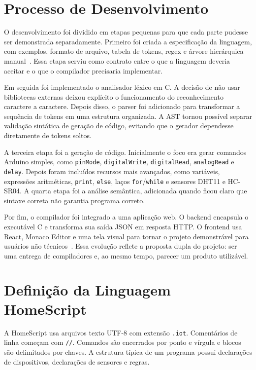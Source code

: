 \documentclass[conference]{IEEEtran}
\begin{document}
\section{Processo de Desenvolvimento}
O desenvolvimento foi dividido em etapas pequenas para que cada parte pudesse ser demonstrada separadamente. Primeiro foi criada a especificação da linguagem, com exemplos, formato de arquivo, tabela de tokens, regex e árvore hierárquica manual~\cite{docs-def,docs-tokens}. Essa etapa serviu como contrato entre o que a linguagem deveria aceitar e o que o compilador precisaria implementar.

Em seguida foi implementado o analisador léxico em C. A decisão de não usar bibliotecas externas deixou explícito o funcionamento do reconhecimento caractere a caractere. Depois disso, o parser foi adicionado para transformar a sequência de tokens em uma estrutura organizada. A AST tornou possível separar validação sintática de geração de código, evitando que o gerador dependesse diretamente de tokens soltos.

A terceira etapa foi a geração de código. Inicialmente o foco era gerar comandos Arduino simples, como \texttt{pinMode}, \texttt{digitalWrite}, \texttt{digitalRead}, \texttt{analogRead} e \texttt{delay}. Depois foram incluídos recursos mais avançados, como variáveis, expressões aritméticas, \texttt{print}, \texttt{else}, laços \texttt{for}/\texttt{while} e sensores DHT11 e HC-SR04. A quarta etapa foi a análise semântica, adicionada quando ficou claro que sintaxe correta não garantia programa correto.

Por fim, o compilador foi integrado a uma aplicação web. O backend encapsula o executável C e transforma sua saída JSON em resposta HTTP. O frontend usa React, Monaco Editor e uma tela visual para tornar o projeto demonstrável para usuários não técnicos~\cite{fastapi,react,monaco}. Essa evolução reflete a proposta dupla do projeto: ser uma entrega de compiladores e, ao mesmo tempo, parecer um produto utilizável.

\section{Definição da Linguagem HomeScript}
A HomeScript usa arquivos texto UTF-8 com extensão \texttt{.iot}. Comentários de linha começam com \texttt{//}. Comandos são encerrados por ponto e vírgula e blocos são delimitados por chaves. A estrutura típica de um programa possui declarações de dispositivos, declarações de sensores e regras.
\end{document}
